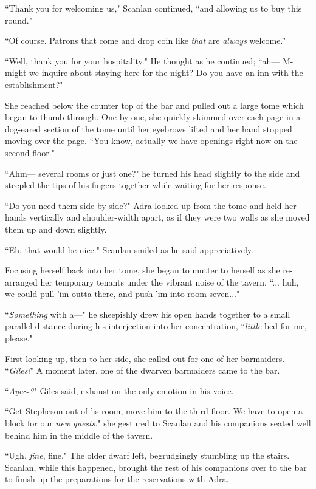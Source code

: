 ``Thank you for welcoming us," Scanlan continued, ``and allowing us to buy this round."

``Of course. Patrons that come and drop coin like \textit{that} are \textit{always} welcome." 

``Well, thank you for your hospitality." He thought as he continued; ``ah--- M-might we inquire about staying here for the night? Do you have an inn with the establishment?"

She reached below the counter top of the bar and pulled out a large tome which began to thumb through. One by one, she quickly skimmed over each page in a dog-eared section of the tome until her eyebrows lifted and her hand stopped moving over the page. ``You know, actually we have openings right now on the second floor."

``Ahm--- several rooms or just one?" he turned his head slightly to the side and steepled the tips of his fingers together while waiting for her response.

``Do you need them side by side?" Adra looked up from the tome and held her hands vertically and shoulder-width apart, as if they were two walls as she moved them up and down slightly.

``Eh, that would be nice." Scanlan smiled as he said appreciatively.

Focusing herself back into her tome, she began to mutter to herself as she re-arranged her temporary tenants under the vibrant noise of the tavern. ``... huh, we could pull 'im outta there, and push 'im into room seven..."

``\textit{Something} with a---" he sheepishly drew his open hands together to a small parallel distance during his interjection into her concentration, ``\textit{little} bed for me, please." 

First looking up, then to her side, she called out for one of her barmaiders. ``\textit{Giles!}" A moment later, one of the dwarven barmaiders came to the bar.

``\textit{Aye$\sim$?}" Giles said, exhaustion the only emotion in his voice.

``Get Stepheson out of 'is room, move him to the third floor. We have to open a block for our \textit{new guests}." she gestured to Scanlan and his companions seated well behind him in the middle of the tavern.

``Ugh, \textit{fine}, fine." The older dwarf left, begrudgingly stumbling up the stairs. Scanlan, while this happened, brought the rest of his companions over to the bar to finish up the preparations for the reservations with Adra.

